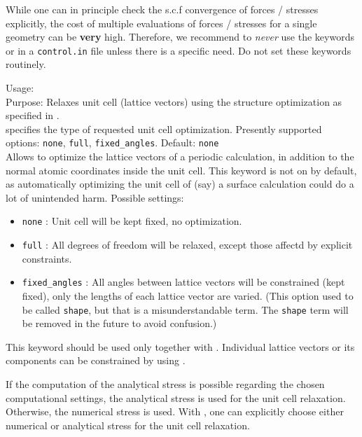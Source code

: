 While one can in principle check the s.c.f convergence of forces /
stresses explicitly, the cost of multiple evaluations
of forces / stresses for a single geometry can be \textbf{very} high.
Therefore, we recommend to \emph{never} use the keywords
 or  
in a \texttt{control.in} file unless there is a specific need. Do not
set these keywords routinely. 


{
  \noindent
  Usage:    \\[1.0ex] 
  Purpose: Relaxes unit cell (lattice vectors) using the structure 
           optimization as specified in . \\[1.0ex]
   specifies the type of requested unit cell 
    optimization. Presently supported options: \texttt{none},
    \texttt{full}, \texttt{fixed\_angles}. Default: \texttt{none}\\
}
Allows to optimize the lattice vectors of a periodic calculation, in
addition to the normal atomic coordinates inside the unit cell. This
keyword is not on by default, as automatically optimizing the unit
cell of (say) a surface calculation could do a lot of unintended
harm. Possible settings:
\begin{itemize}
  \item \texttt{none} : Unit cell will be kept fixed, no
    optimization. 
  \item \texttt{full} : All  degrees of
    freedom will be relaxed, except those affectd by explicit
    constraints.
  \item \texttt{fixed\_angles} : All angles between lattice vectors
    will be constrained (kept fixed), only the lengths of each lattice
    vector are varied. (This option used to be called \texttt{shape}, but
    that is a misunderstandable term. The \texttt{shape} term will be
    removed in the future to avoid confusion.)
\end{itemize}
This keyword should be used only together with .
Individual lattice vectors or its components can be constrained by using 
.

If the computation of the analytical stress is possible regarding the chosen
computational settings, the analytical stress is used for the unit cell
relaxation. Otherwise, the numerical stress is used. With
, one can explicitly choose either numerical or
analytical stress for the unit cell relaxation.

